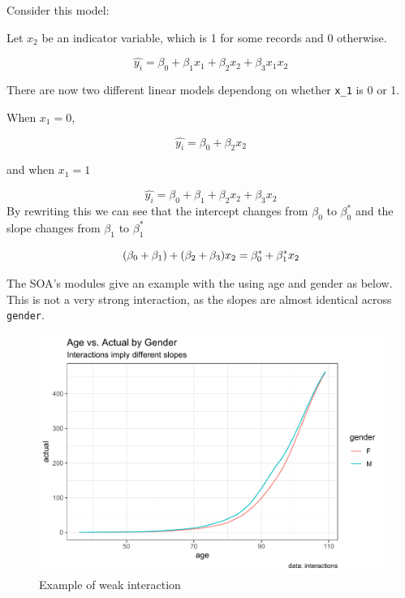 \documentclass[openany]{book}
\newenvironment{Shaded}{\begin{snugshade}}{\end{snugshade}}
\newcommand{\DataTypeTok}[1]{\textcolor[rgb]{0.13,0.29,0.53}{#1}}
\newcommand{\KeywordTok}[1]{\textcolor[rgb]{0.13,0.29,0.53}{\textbf{#1}}}
\newcommand{\NormalTok}[1]{#1}
\newcommand{\OperatorTok}[1]{\textcolor[rgb]{0.81,0.36,0.00}{\textbf{#1}}}
\newcommand{\StringTok}[1]{\textcolor[rgb]{0.31,0.60,0.02}{#1}}
\begin{document}
Consider this model:

Let \(x_2\) be an indicator variable, which is 1 for some records and 0 otherwise.

\[\hat{y_i} = \beta_0 + \beta_1 x_1 + \beta_2 x_2 + \beta_3 x_1 x_2\]

There are now two different linear models dependong on whether \texttt{x\_1} is 0 or 1.

When \(x_1 = 0\),

\[\hat{y_i} = \beta_0  + \beta_2 x_2\]

and when \(x_1 = 1\)

\[\hat{y_i} = \beta_0 + \beta_1 + \beta_2 x_2 + \beta_3 x_2\]
By rewriting this we can see that the intercept changes from \(\beta_0\) to \(\beta_0^*\) and the slope changes from \(\beta_1\) to \(\beta_1^*\)

\[
(\beta_0 + \beta_1) + (\beta_2 + \beta_3 ) x_2 \\
 = \beta_0^* + \beta_1^* x_2
\]

The SOA's modules give an example with the using age and gender as below. This is not a very strong interaction, as the slopes are almost identical across \texttt{gender}.

\begin{Shaded}
\end{Shaded}

\begin{figure}
\centering
\includegraphics{05-linear-models_files/figure-latex/unnamed-chunk-23-1.pdf}
\caption{\label{fig:unnamed-chunk-23}Example of weak interaction}
\end{figure}
\end{document}
